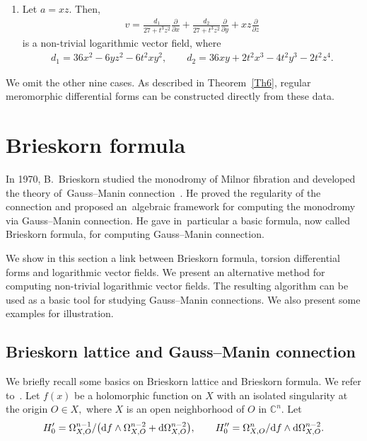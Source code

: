 \documentclass[10pt,a4paper]{amsart}
\numberwithin{equation}{section}
\begin{document}
\begin{Example}
\begin{enumerate}
\item[$(ii)$] Let $ a=xz$. Then,
\begin{gather*}
v=\frac{d_1}{27+t^3z^2}\frac{\partial}{\partial x} +\frac{d_2}{27+t^3z^2}\frac{\partial}{\partial y} +xz\frac{\partial}{\partial z}
\end{gather*}
is a non-trivial logarithmic vector field, where
\begin{gather*}
d_1=36x^2-6yz^2-6t^2xy^2, \qquad d_2=36xy+2t^2x^3-4t^2y^3-2t^2z^4.
\end{gather*}
\end{enumerate}
We omit the other nine cases. As described in Theorem~\ref{Th6}, regular meromorphic differential forms can be constructed directly from these data.
\end{Example}

\section{Brieskorn formula}\label{sec5}

In 1970, B.~Brieskorn studied the monodromy of Milnor fibration and developed the theory of~Gauss--Manin connection~\cite{Br}. He proved the regularity of the connection and proposed an~alge\-braic framework for computing the monodromy via Gauss--Manin connection. He gave in~particular a basic formula, now called Brieskorn formula, for computing Gauss--Manin connection.

We show in this section a link between Brieskorn formula, torsion differential forms and logarithmic vector fields. We present an alternative method for computing non-trivial logarithmic vector fields. The resulting algorithm can be used as a basic tool for studying Gauss--Manin connections. We also present some examples for illustration.

\subsection{Brieskorn lattice and Gauss--Manin connection}

We briefly recall some basics on Brieskorn lattice and Brieskorn formula. We refer to~\cite{BS, Br, Schu}.
Let $f(x) $ be a holomorphic function on $X$ with an isolated singularity at the origin $ O \in X, $ where $X$ is an open neighborhood of $ O $ in $ {\mathbb C}^n$.
Let
\begin{gather*}
H_{0}^{\prime} = \Omega_{X, O}^{n-1}/\big({\rm d}f\wedge \Omega_{X,O}^{n-2} + {\rm d} \Omega_{X,O}^{n-2}\big), \qquad H_{0}^{\prime\prime}=\Omega_{X,O}^{n}/{\rm d}f\wedge {\rm d}\Omega_{X,O}^{n-2}.
\end{gather*}
\end{document}
